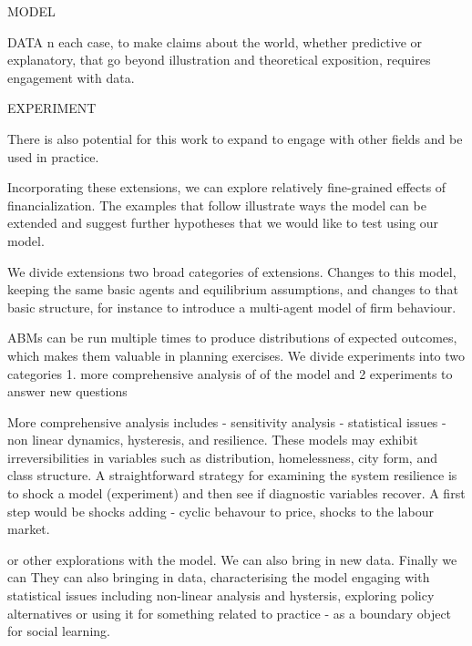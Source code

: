 MODEL

DATA
n each case, to make claims about the world, whether predictive or explanatory, that go beyond illustration and 
theoretical exposition, requires engagement with data.  %




EXPERIMENT

There is also potential for this work to expand to engage with other fields and be used in practice.



Incorporating these extensions, we can explore relatively fine-grained effects of financialization. The examples that follow  illustrate   ways the model can be extended and suggest further hypotheses that we  would like to test using our model.

We divide extensions two broad categories of extensions. Changes to this model, keeping the same basic agents and equilibrium assumptions, and changes to that basic structure, for instance to introduce a multi-agent model of firm behaviour.

ABMs can be run multiple times to produce distributions of expected outcomes, which makes them valuable in planning exercises.
We divide experiments into two categories 1. more comprehensive analysis of of the model and 2 experiments to answer new questions

More comprehensive analysis includes
- sensitivity analysis
- statistical issues
- non linear dynamics, hysteresis, and resilience. %
These models may exhibit irreversibilities in variables such as distribution, homelessness, city form, and class structure. 
A straightforward strategy for examining the system resilience is to shock a model (experiment) and then see if diagnostic variables recover. %
A first step would be shocks adding - cyclic behavour to price, shocks  to the labour market.

 or other explorations with the model. We can also bring in new data. Finally we can
They can also bringing in data, characterising the model engaging with statistical issues including non-linear analysis and hystersis, exploring policy alternatives or using it for something related to practice - as a boundary object for social learning.


